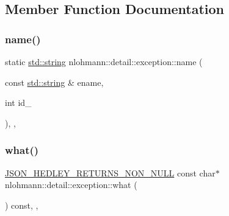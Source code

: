 \subsection{Member Function Documentation}
\mbox{\label{classnlohmann_1_1detail_1_1exception_abf41a7e9178356314082284e6cfea278}} 
\subsubsection{\texorpdfstring{name()}{name()}}
{\footnotesize\ttfamily static \mbox{\hyperlink{namespacenlohmann_1_1detail_a1ed8fc6239da25abcaf681d30ace4985ab45cffe084dd3d20d928bee85e7b0f21}{std\+::string}} nlohmann\+::detail\+::exception\+::name (\begin{DoxyParamCaption}\item[{const \mbox{\hyperlink{namespacenlohmann_1_1detail_a1ed8fc6239da25abcaf681d30ace4985ab45cffe084dd3d20d928bee85e7b0f21}{std\+::string}} \&}]{ename,  }\item[{int}]{id\+\_\+ }\end{DoxyParamCaption})\hspace{0.3cm}{\ttfamily [inline]}, {\ttfamily [static]}, {\ttfamily [protected]}}

\mbox{\label{classnlohmann_1_1detail_1_1exception_a2ecff34cee144f843644a252a07cdadc}} 
\subsubsection{\texorpdfstring{what()}{what()}}
{\footnotesize\ttfamily \mbox{\hyperlink{json_8hpp_a5f2aaec3b681d0a72f7d6e90b70cdcd1}{J\+S\+O\+N\+\_\+\+H\+E\+D\+L\+E\+Y\+\_\+\+R\+E\+T\+U\+R\+N\+S\+\_\+\+N\+O\+N\+\_\+\+N\+U\+LL}} const char$\ast$ nlohmann\+::detail\+::exception\+::what (\begin{DoxyParamCaption}{ }\end{DoxyParamCaption}) const\hspace{0.3cm}{\ttfamily [inline]}, {\ttfamily [override]}, {\ttfamily [noexcept]}}




